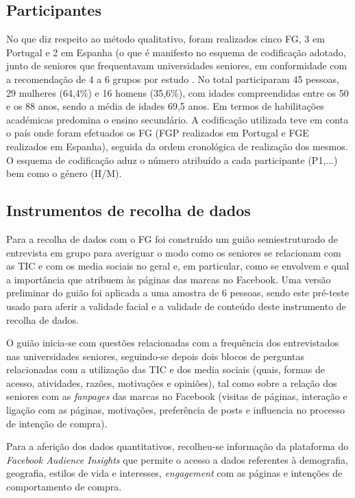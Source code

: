 \documentclass[portuguese]{textolivre}
\begin{document}
\subsection{Participantes}
No que diz respeito ao método qualitativo, foram realizados cinco FG, 3 em Portugal e 2 em Espanha (o que é manifesto no esquema de codificação adotado, junto de seniores que frequentavam universidades seniores, em conformidade com a recomendação de 4 a 6 grupos por estudo \cite{morgan1996}. No total participaram 45 pessoas, 29 mulheres (64,4\%) e 16 homens (35,6\%), com idades compreendidas entre os 50 e os 88 anos, sendo a média de idades 69,5 anos. Em termos de habilitações académicas predomina o ensino secundário. A codificação utilizada teve em conta o país onde foram efetuados os FG (FGP realizados em Portugal e FGE realizados em Espanha), seguida da ordem cronológica de realização dos mesmos. O esquema de codificação aduz o número atribuído a cada participante (P1,...) bem como o género (H/M).

\subsection{Instrumentos de recolha de dados}
Para a recolha de dados com o FG foi construído um guião semiestruturado de entrevista em grupo para averiguar o modo como os seniores se relacionam com as TIC e com os media sociais no geral e, em particular, como se envolvem e qual a importância que atribuem às páginas das marcas no Facebook. Uma versão preliminar do guião foi aplicada a uma amostra de 6 pessoas, sendo este pré-teste usado para aferir a validade facial e a validade de conteúdo deste instrumento de recolha de dados.

O guião inicia-se com questões relacionadas com a frequência dos entrevistados nas universidades seniores, seguindo-se depois dois blocos de perguntas relacionadas com a utilização das TIC e dos media sociais (quais, formas de acesso, atividades, razões, motivações e opiniões), tal como sobre a relação dos seniores com as \emph{fanpages} das marcas no Facebook (visitas de páginas, interação e ligação com as páginas, motivações, preferência de posts e influencia no processo de intenção de compra).

Para a aferição dos dados quantitativos, recolheu-se informação da plataforma do \emph{Facebook Audience Insights} que permite o acesso a dados referentes à demografia, geografia, estilos de vida e interesses, \emph{engagement} com as páginas e intenções de comportamento de compra.
\end{document}
